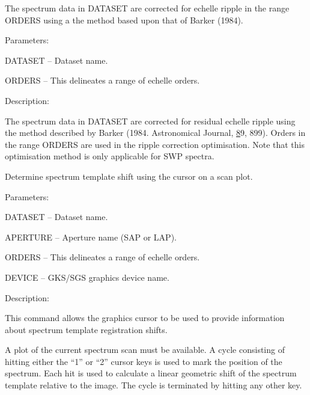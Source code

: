\begin {description}

\item [BARKER] The spectrum data in DATASET are corrected for echelle 
ripple in the range ORDERS using a the method based upon that of
Barker (1984).

\begin {description}
\item Parameters:

\begin {description}
\item DATASET -- Dataset name.
\item ORDERS -- This delineates a range of echelle orders.
\end {description}

\item Description:

The spectrum data in DATASET are corrected for residual echelle ripple
using  the method described by Barker (1984. Astronomical Journal,
{\underline 89},  899). Orders in the range ORDERS are used in the
ripple correction optimisation.  Note that this optimisation method is
only applicable for SWP spectra. \end {description}

\item [CGSHIFT] Determine spectrum template shift using the cursor on
a  scan plot.

\begin {description}
\item Parameters:

\begin {description}
\item DATASET -- Dataset name.
\item APERTURE -- Aperture name (SAP or LAP).
\item ORDERS -- This delineates a range of echelle orders.
\item DEVICE -- GKS/SGS graphics device name.
\end {description}

\item Description:

This command allows the graphics cursor to be used to provide
information about spectrum template registration shifts.

A plot of the current spectrum scan must be available. A cycle
consisting of hitting either the ``1'' or ``2'' cursor keys is used to
mark the position of the spectrum. Each hit is used to calculate a
linear geometric shift of the spectrum template relative to the image.
The cycle is terminated by hitting any other key.


\end{description}
\end{description}
